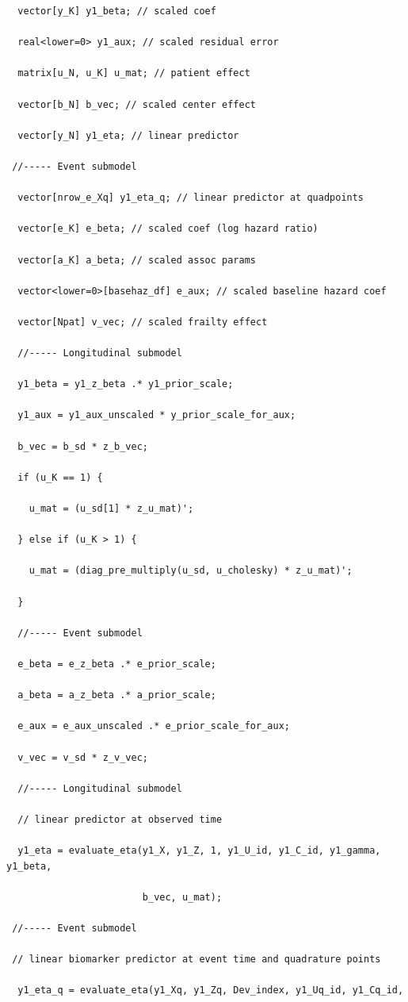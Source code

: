 \begin{SingleSpace}
\begin{verbatim}
  vector[y_K] y1_beta; // scaled coef

  real<lower=0> y1_aux; // scaled residual error 

  matrix[u_N, u_K] u_mat; // patient effect  

  vector[b_N] b_vec; // scaled center effect 

  vector[y_N] y1_eta; // linear predictor 

 //----- Event submodel
 
  vector[nrow_e_Xq] y1_eta_q; // linear predictor at quadpoints

  vector[e_K] e_beta; // scaled coef (log hazard ratio)

  vector[a_K] a_beta; // scaled assoc params 

  vector<lower=0>[basehaz_df] e_aux; // scaled baseline hazard coef

  vector[Npat] v_vec; // scaled frailty effect
  
  //----- Longitudinal submodel 
  
  y1_beta = y1_z_beta .* y1_prior_scale;

  y1_aux = y1_aux_unscaled * y_prior_scale_for_aux;

  b_vec = b_sd * z_b_vec;

  if (u_K == 1) {

    u_mat = (u_sd[1] * z_u_mat)';

  } else if (u_K > 1) {

    u_mat = (diag_pre_multiply(u_sd, u_cholesky) * z_u_mat)';

  }

  //----- Event submodel

  e_beta = e_z_beta .* e_prior_scale;

  a_beta = a_z_beta .* a_prior_scale;

  e_aux = e_aux_unscaled .* e_prior_scale_for_aux;

  v_vec = v_sd * z_v_vec;

  //----- Longitudinal submodel 
  
  // linear predictor at observed time
   
  y1_eta = evaluate_eta(y1_X, y1_Z, 1, y1_U_id, y1_C_id, y1_gamma, y1_beta,

                        b_vec, u_mat);
                        
 //----- Event submodel 
 
 // linear biomarker predictor at event time and quadrature points  

  y1_eta_q = evaluate_eta(y1_Xq, y1_Zq, Dev_index, y1_Uq_id, y1_Cq_id,


\end{verbatim}
\end{SingleSpace}
